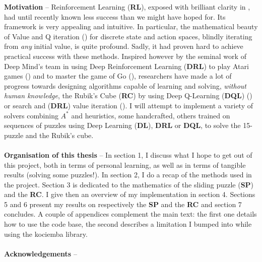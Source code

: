 
\label{Abstract}
\noindent \textbf{Motivation} -- Reinforcement Learning (\textbf{RL}), exposed with brilliant clarity in \cite{Sutton1998}, had until recently known less success than we might have hoped for. Its framework is very appealing and intuitive. In particular, the mathematical beauty of Value and Q iteration (\cite{WatkinsThesis}) for discrete state and action spaces, blindly iterating from \textit{any} initial value, is quite profound. Sadly, it had proven hard to achieve practical success with these methods. Inspired however by the seminal work of Deep Mind's team in using Deep Reinforcement Learning (\textbf{DRL}) to play Atari games (\cite{Mnih2013})  and to master the game of Go (\cite{AlphaGo}), researchers have made a lot of progress towards designing algorithms capable of learning and solving, \textit{without human knowledge}, the Rubik's Cube (\textbf{RC}) by using Deep Q-Learning (\textbf{DQL})  (\cite{DBLP:journals/corr/abs-1805-07470}) or search and (\textbf{DRL}) value iteration (\cite{https://doi.org/10.48550/arxiv.1805.07470}). I will attempt to implement a variety of solvers combining $A^{*}$ and heuristics, some handcrafted, others trained on sequences of puzzles using Deep Learning (\textbf{DL}), \textbf{DRL} or \textbf{DQL}, to solve the 15-puzzle and the Rubik's cube.
\\
\\
\textbf{Organisation of this thesis} -- In section 1, I discuss what I hope to get out of this project, both in terms of personal learning, as well as in terms of tangible results (solving some puzzles!). In section 2, I do a recap of the methods used in the project. Section 3 is dedicated to the mathematics of the sliding puzzle (\textbf{SP}) and the \textbf{RC}. I give then an overview of my implementation in section 4. Sections 5 and 6 present my results on respectively the \textbf{SP} and the \textbf{RC} and section 7 concludes. A couple of appendices complement the main text: the first one details how to use the code base, the second describes a limitation I bumped into while using the kociemba library.
\\
\\
\noindent \textbf{Acknowledgements} -- 
